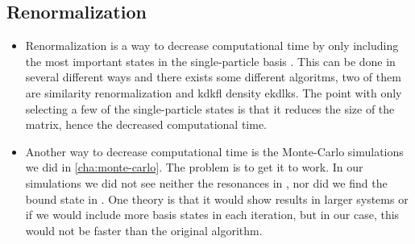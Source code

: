 \documentclass[../main/report.tex]{subfiles}
\begin{document}
\subsection{Renormalization}
  \begin{itemize}
    \item Renormalization is a way to decrease computational time by only including the most important states in the single-particle basis \cite{jimmy}.
    This can be done in several different ways and there exists some different algoritms, two of them are similarity renormalization and kdkfl density ekdlks.
    The point with only selecting a few of the single-particle states is that it reduces the size of the matrix, hence the decreased computational time.
    \item Another way to decrease computational time is the Monte-Carlo simulations we did in \cref{cha:monte-carlo}.
    The problem is to get it to work.
    In our simulations we did not see neither the resonances in , nor did we find the bound state in .
    One theory is that it would show results in larger systems or if we would include more basis states in each iteration, but in our case, this would not be faster than the original algorithm.
  \end{itemize}
\end{document}
